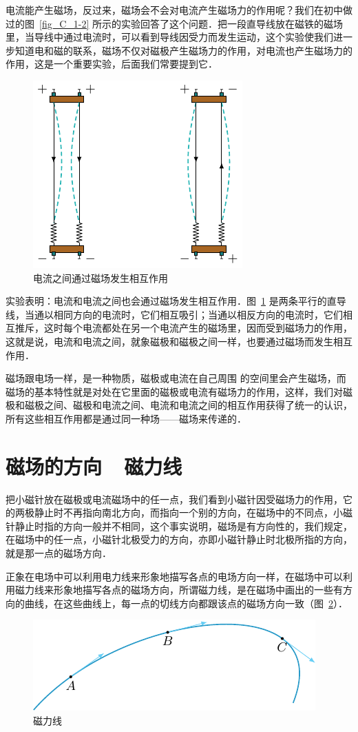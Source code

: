 电流能产生磁场，反过来，磁场会不会对电流产生磁场力的作用呢？我们在初中做过的图~\ref{fig_C_1-2} 所示的实验回答了这个问题．把一段直导线放在磁铁的磁场里，当导线中通过电流时，可以看到导线因受力而发生运动，这个实验使我们进一步知道电和磁的联系，磁场不仅对磁极产生磁场力的作用，对电流也产生磁场力的作用，这是一个重要实验，后面我们常要提到它．

\begin{figure}[htbp]
    \centering
    \includegraphics{fig/C/1-3.pdf}
    \caption{电流之间通过磁场发生相互作用}\label{fig_C_1-3}
\end{figure}

实验表明：电流和电流之间也会通过磁场发生相互作用．图~\ref{fig_C_1-3} 是两条平行的直导线，当通以相同方向的电流时，它们相互吸引；当通以相反方向的电流时，它们相互推斥，这时每个电流都处在另一个电流产生的磁场里，因而受到磁场力的作用，这就是说，电流和电流之间，就象磁极和磁极之间一样，也要通过磁场而发生相互作用．

磁场跟电场一样，是一种物质，磁极或电流在自己周围
的空间里会产生磁场，而磁场的基本特性就是对处在它里面的磁极或电流有磁场力的作用，这样，我们对磁极和磁极之间、磁极和电流之间、电流和电流之间的相互作用获得了统一的认识，所有这些相互作用都是通过同一种场——磁场来传递的．

\section{磁场的方向~~磁力线}
把小磁针放在磁极或电流磁场中的任一点，我们看到小磁针因受磁场力的作用，它的两极静止时不再指向南北方向，而指向一个别的方向，在磁场中的不同点，小磁针静止时指的方向一般并不相同，这个事实说明，磁场是有方向性的，我们规定，在磁场中的任一点，小磁针北极受力的方向，亦即小磁针静止时北极所指的方向，就是那一点的磁场方向．

正象在电场中可以利用电力线来形象地描写各点的电场方向一样，在磁场中可以利用磁力线来形象地描写各点的磁场方向，所谓磁力线，是在磁场中画出的一些有方向的曲线，在这些曲线上，每一点的切线方向都跟该点的磁场方向一致（图~\ref{fig_C_1-4}）．
\begin{figure}[htbp]
    \centering
    \includegraphics{fig/C/1-4.pdf}
    \caption{磁力线}\label{fig_C_1-4}
\end{figure}

